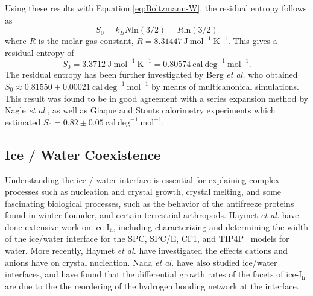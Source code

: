 Using these results with Equation \eqref{eq:Boltzmann-W}, the residual
entropy follows as
\begin{equation}
S_{0} = k_{B}N\mathrm{ln}(3/2) = R\mathrm{ln}(3/2)
\end{equation}
where $R$ is the molar gas constant,
$R = 8.31447~\mathrm{J~mol}^{-1}~\mathrm{K}^{-1}$. This gives a
residual entropy of
\begin{equation}
  S_{0} = 3.3712~\mathrm{J~mol}^{-1}~\mathrm{K}^{-1} = 0.80574~\mathrm{cal~deg}^{-1}~ \mathrm{mol}^{-1}.
\end{equation}
The residual entropy has been further investigated by Berg \textit{et
  al.} who obtained
$S_{0} \approx 0.81550 \pm 0.00021~\mathrm{cal~deg}^{-1}
~\mathrm{mol}^{-1}$ by means of multicanonical
simulations.\cite{Berg2007} This result was found to be in good
agreement with a series expansion method by Nagle \textit{et
  al.}\cite{Nagle1966}, as well as Giaque and Stouts calorimetry
experiments which estimated
$S_{0} = 0.82 \pm 0.05~\mathrm{cal~deg}^{-1}
~\mathrm{mol}^{-1}$.\cite{Giaque1936}


\subsection{Ice / Water Coexistence}
%

Understanding the ice / water interface is essential for explaining
complex processes such as nucleation and crystal
growth,\cite{Han1992,Granasy1995,Vanfleet1995} crystal
melting,\cite{Weber1983,Han1992,Sakai1996,Sakai1996B} and some
fascinating biological processes, such as the behavior of the
antifreeze proteins found in winter flounder,\cite{Chapsky1997
  ,Wierzbicki2007} and certain terrestrial
arthropods.\cite{Duman:2001qy,Meister29012013} Haymet \textit{et al.}
have done extensive work on ice-I$_\mathrm{h}$, including
characterizing and determining the width of the ice/water interface
for the SPC,\cite{Karim1990} SPC/E,\cite{Gay2002,Bryk2002}
CF1,\cite{Hayward2001,Hayward2002} and TIP4P~\cite{Karim1988} models
for water.  More recently, Haymet \emph{et al.} have investigated the
effects cations and anions have on crystal
nucleation.\cite{Bryk2004,Smith2005,Wilson2008,Wilson2010} Nada
\textit{et al.}  have also studied ice/water
interfaces,\cite{Nada1995,Nada2000,Nada2003a,Nada2012} and have found
that the differential growth rates of the facets of ice-I$_\mathrm{h}$
are due to the the reordering of the hydrogen bonding network at the
interface.\cite{Nada2005}


